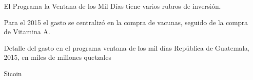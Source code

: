   
    {%
    	El Programa la Ventana de los Mil Días tiene varios rubros de inversión.
    	
    	Para el 2015 el gasto se centralizó en la compra de vacunas, seguido de la compra de Vitamina A.
    }%
    {%
    	Detalle del gasto en el programa ventana de los mil días} %
    {%
    	República de Guatemala, 2015, en miles de millones quetzales} %
    {%
    	\begin{tikzpicture}[x=1pt,y=1pt]    \end{tikzpicture}}%
    {%
    	Sicoin} %
  